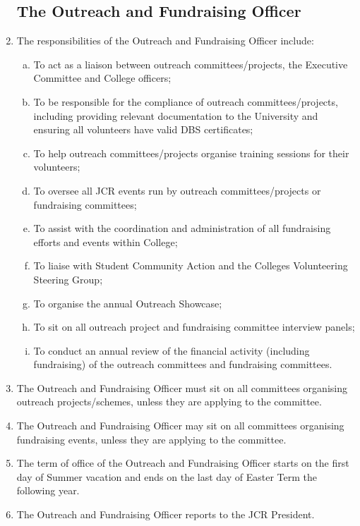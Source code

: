 \documentclass[12pt]{article}
\begin{document}
\begin{enumerate}
    \subsection{The Outreach and Fundraising Officer}
    \item The responsibilities of the Outreach and Fundraising Officer include:
    \begin{enumerate}[(a)]
        \item To act as a liaison between outreach committees/projects, the Executive Committee and College officers;
        \item To be responsible for the compliance of outreach committees/projects, including providing relevant documentation to the University and ensuring all volunteers have valid DBS certificates;
        \item To help outreach committees/projects organise training sessions for their volunteers;
        \item To oversee all JCR events run by outreach committees/projects or fundraising committees;
        \item To assist with the coordination and administration of all fundraising efforts and events within College;
        \item To liaise with Student Community Action and the Colleges Volunteering Steering Group;
        \item To organise the annual Outreach Showcase;
        \item To sit on all outreach project and fundraising committee interview panels;
        \item To conduct an annual review of the financial activity (including fundraising) of the outreach committees and fundraising committees.
    \end{enumerate}
    \item The Outreach and Fundraising Officer must sit on all committees organising outreach projects/schemes, unless they are applying to the committee.
    \item The Outreach and Fundraising Officer may sit on all committees organising fundraising events, unless they are applying to the committee.
    \item The term of office of the Outreach and Fundraising Officer starts on the first day of Summer vacation and ends on the last day of Easter Term the following year.
    \item The Outreach and Fundraising Officer reports to the JCR President.

\end{enumerate}
\end{document}
